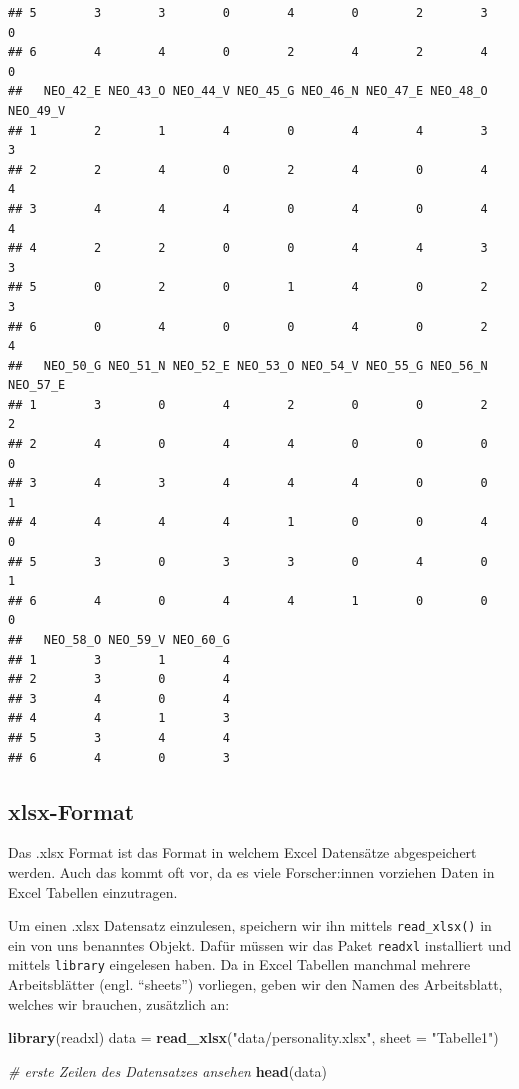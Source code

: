 \documentclass[
]{book}
\newenvironment{Shaded}{\begin{snugshade}}{\end{snugshade}}
\newcommand{\AttributeTok}[1]{\textcolor[rgb]{0.13,0.29,0.53}{#1}}
\newcommand{\CommentTok}[1]{\textcolor[rgb]{0.56,0.35,0.01}{\textit{#1}}}
\newcommand{\FunctionTok}[1]{\textcolor[rgb]{0.13,0.29,0.53}{\textbf{#1}}}
\newcommand{\NormalTok}[1]{#1}
\newcommand{\OtherTok}[1]{\textcolor[rgb]{0.56,0.35,0.01}{#1}}
\newcommand{\StringTok}[1]{\textcolor[rgb]{0.31,0.60,0.02}{#1}}
\begin{document}
\begin{verbatim}
## 5        3        3        0        4        0        2        3        0
## 6        4        4        0        2        4        2        4        0
##   NEO_42_E NEO_43_O NEO_44_V NEO_45_G NEO_46_N NEO_47_E NEO_48_O NEO_49_V
## 1        2        1        4        0        4        4        3        3
## 2        2        4        0        2        4        0        4        4
## 3        4        4        4        0        4        0        4        4
## 4        2        2        0        0        4        4        3        3
## 5        0        2        0        1        4        0        2        3
## 6        0        4        0        0        4        0        2        4
##   NEO_50_G NEO_51_N NEO_52_E NEO_53_O NEO_54_V NEO_55_G NEO_56_N NEO_57_E
## 1        3        0        4        2        0        0        2        2
## 2        4        0        4        4        0        0        0        0
## 3        4        3        4        4        4        0        0        1
## 4        4        4        4        1        0        0        4        0
## 5        3        0        3        3        0        4        0        1
## 6        4        0        4        4        1        0        0        0
##   NEO_58_O NEO_59_V NEO_60_G
## 1        3        1        4
## 2        3        0        4
## 3        4        0        4
## 4        4        1        3
## 5        3        4        4
## 6        4        0        3
\end{verbatim}

\subsection{xlsx-Format}\label{xlsx-format}

Das .xlsx Format ist das Format in welchem Excel Datensätze abgespeichert werden. Auch das kommt oft vor, da es viele Forscher:innen vorziehen Daten in Excel Tabellen einzutragen.

Um einen .xlsx Datensatz einzulesen, speichern wir ihn mittels \texttt{read\_xlsx()} in ein von uns benanntes Objekt. Dafür müssen wir das Paket \texttt{readxl} installiert und mittels \texttt{library} eingelesen haben. Da in Excel Tabellen manchmal mehrere Arbeitsblätter (engl. ``sheets'') vorliegen, geben wir den Namen des Arbeitsblatt, welches wir brauchen, zusätzlich an:

\begin{Shaded}
\begin{Highlighting}[]
\FunctionTok{library}\NormalTok{(readxl)}
\NormalTok{data }\OtherTok{=} \FunctionTok{read\_xlsx}\NormalTok{(}\StringTok{"data/personality.xlsx"}\NormalTok{, }\AttributeTok{sheet =} \StringTok{"Tabelle1"}\NormalTok{)}

\CommentTok{\# erste Zeilen des Datensatzes ansehen}
\FunctionTok{head}\NormalTok{(data)}
\end{Highlighting}
\end{Shaded}
\end{document}
